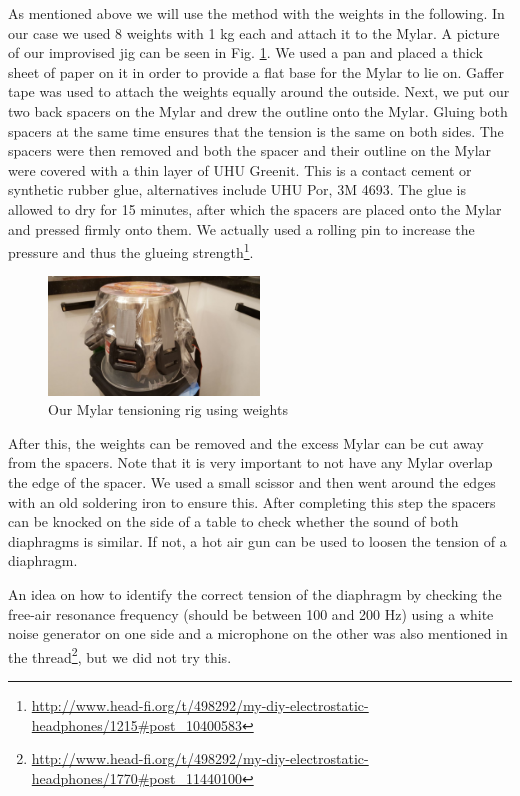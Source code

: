 \documentclass{article}
\begin{document}
As mentioned above we will use the method with the weights in the following. In our case we used 8 weights with 1 kg each and attach it to the Mylar. A picture of our improvised jig can be seen in Fig. \ref{f:driver:tension:weight:2}. We used a pan and placed a thick sheet of paper on it in order to provide a flat base for the Mylar to lie on. Gaffer tape was used to attach the weights equally around the outside. Next, we put our two back spacers on the Mylar and drew the outline onto the Mylar. Gluing both spacers at the same time ensures that the tension is the same on both sides. The spacers were then removed and both the spacer and their outline on the Mylar were covered with a thin layer of UHU Greenit. This is a contact cement or synthetic rubber glue, alternatives include UHU Por, 3M 4693. The glue is allowed to dry for 15 minutes, after which the spacers are placed onto the Mylar and pressed firmly onto them. We actually used a rolling pin to increase the pressure and thus the glueing strength\footnote{\url{http://www.head-fi.org/t/498292/my-diy-electrostatic-headphones/1215#post_10400583}}.
\begin{figure}[htb]
    \centering
    \includegraphics[width=0.5\textwidth]{images/mylar-tension-weight-2.png}
    \caption{Our Mylar tensioning rig using weights}
    \label{f:driver:tension:weight:2}
\end{figure}
After this, the weights can be removed and the excess Mylar can be cut away from the spacers. Note that it is very important to not have any Mylar overlap the edge of the spacer. We used a small scissor and then went around the edges with an old soldering iron to ensure this. After completing this step the spacers can be knocked on the side of a table to check whether the sound of both diaphragms is similar. If not, a  hot air gun can be used to loosen the tension of a diaphragm.

An idea on how to identify the correct tension of the diaphragm by checking the free-air resonance frequency (should be between 100 and 200 Hz) using a white noise generator on one side and a microphone on the other was also mentioned in the thread\footnote{\url{http://www.head-fi.org/t/498292/my-diy-electrostatic-headphones/1770#post_11440100}}, but we did not try this.
\end{document}
